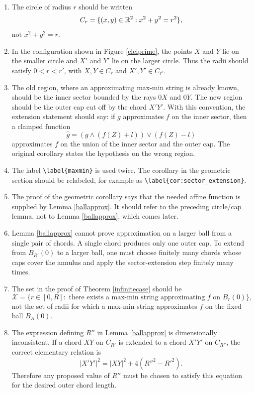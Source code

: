 \begin{enumerate}
    \item The circle of radius $r$ should be written
    \[
    C_r=\{(x,y)\in\mathbb{R}^2:x^2+y^2=r^2\},
    \]
    not $x^2+y^2=r$.

    \item In the configuration shown in Figure \ref{elelprime}, the points $X$ and $Y$ lie on the smaller circle and $X'$ and $Y'$ lie on the larger circle.  Thus the radii should satisfy $0<r<r'$, with $X,Y\in C_r$ and $X',Y'\in C_{r'}$.

    \item The old region, where an approximating max-min string is already known, should be the inner sector bounded by the rays $0X$ and $0Y$.  The new region should be the outer cap cut off by the chord $X'Y'$.  With this convention, the extension statement should say: if $g$ approximates $f$ on the inner sector, then a clamped function
    \[
    \widehat g=(g\wedge(f(Z)+l))\vee(f(Z)-l)
    \]
    approximates $f$ on the union of the inner sector and the outer cap.  The original corollary states the hypothesis on the wrong region.

    \item The label \verb|\label{maxmin}| is used twice.  The corollary in the geometric section should be relabeled, for example as \verb|\label{cor:sector_extension}|.

    \item The proof of the geometric corollary says that the needed affine function is supplied by Lemma \ref{ballapprox}.  It should refer to the preceding circle/cap lemma, not to Lemma \ref{ballapprox}, which comes later.

    \item Lemma \ref{ballapprox} cannot prove approximation on a larger ball from a single pair of chords.  A single chord produces only one outer cap.  To extend from $B_{R'}(0)$ to a larger ball, one must choose finitely many chords whose caps cover the annulus and apply the sector-extension step finitely many times.

    \item The set in the proof of Theorem \ref{infinitecase} should be
    \[
    \mathcal X=\{r\in[0,R]:\text{ there exists a max-min string approximating }f\text{ on }B_r(0)\},
    \]
    not the set of radii for which a max-min string approximates $f$ on the fixed ball $B_R(0)$.

    \item The expression defining $R''$ in Lemma \ref{ballapprox} is dimensionally inconsistent.  If a chord $XY$ on $C_{R'}$ is extended to a chord $X'Y'$ on $C_{R''}$, the correct elementary relation is
    \[
    |X'Y'|^2=|XY|^2+4(R''^2-R'^2).
    \]
    Therefore any proposed value of $R''$ must be chosen to satisfy this equation for the desired outer chord length.
\end{enumerate}

